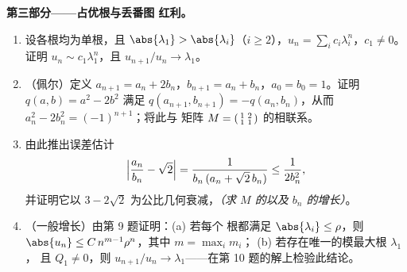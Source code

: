 \begin{problem}
\medskip
\noindent\textbf{第三部分——占优根与丢番图
红利。}
\begin{enumerate}[resume]
  \item 设各根均为单根，且 $\abs{\lambda_1} >
        \abs{\lambda_i}$（$i \geq 2$），$u_n = \sum_i c_i
        \lambda_i^n$，$c_1 \neq 0$。证明 $u_n \sim
        c_1\lambda_1^n$，且 $u_{n+1}/u_n \to \lambda_1$。
  \item （佩尔）定义 $a_{n+1} = a_n + 2b_n$，$b_{n+1} = a_n +
        b_n$，$a_0 = b_0 = 1$。证明 $q(a, b) = a^2 - 2b^2$
        满足 $q(a_{n+1}, b_{n+1}) = -q(a_n, b_n)$，从而
        $a_n^2 - 2b_n^2 = (-1)^{n+1}$；将此与
        矩阵 $M = \begin{psmallmatrix}1 & 2\\ 1 &
        1\end{psmallmatrix}$ 的相联系。
  \item 由此推出误差估计
        \[
        \Bigl|\frac{a_n}{b_n} - \sqrt2\Bigr|
        = \frac{1}{b_n\,(a_n + \sqrt2\,b_n)}
        \leq \frac{1}{2b_n^2},
        \]
        并证明它以 $3 -
        2\sqrt2$ 为公比几何衰减，\emph{（求 $M$ 的以及
        $b_n$ 的增长）}。
  \item （一般增长）由第 9 题证明：(a) 若每个
        根都满足 $\abs{\lambda_i} \leq \rho$，则
        $\abs{u_n} \leq C\,n^{m-1}\rho^n$，其中 $m = \max_i m_i$；
        (b) 若存在唯一的模最大根 $\lambda_1$，
        且 $Q_1 \neq 0$，则 $u_{n+1}/u_n \to
        \lambda_1$——在第 10 题的解上检验此结论。
\end{enumerate}


\end{problem}
